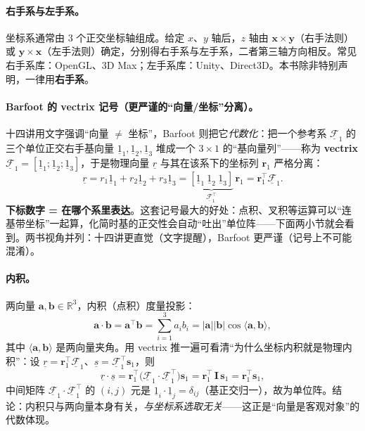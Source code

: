 \paragraph{右手系与左手系。}坐标系通常由 $3$ 个正交坐标轴组成。给定 $x$、$y$ 轴后，$z$ 轴由 $\mathbf{x}\times\mathbf{y}$（右手法则）或 $\mathbf{y}\times\mathbf{x}$（左手法则）确定，分别得右手系与左手系，二者第三轴方向相反。常见右手系库：OpenGL、3D Max；左手系库：Unity、Direct3D\cite{gaoxiang2019slam14}。本书除非特别声明，一律用\textbf{右手系}。

\paragraph{Barfoot 的 vectrix 记号（更严谨的“向量/坐标”分离）。}十四讲用文字强调“向量 $\neq$ 坐标”，Barfoot\cite{barfoot2024state} 则把它\emph{代数化}：把一个参考系 $\underline{\mathcal{F}}_1$ 的三个单位正交右手基向量 $\underline{1}_1,\underline{1}_2,\underline{1}_3$ 堆成一个 $3\times1$ 的“基向量列”——称为 \textbf{vectrix} $\underline{\mathcal{F}}_1=[\underline{1}_1;\underline{1}_2;\underline{1}_3]$，于是物理向量 $\underline{r}$ 与其在该系下的坐标列 $\mathbf{r}_1$ 严格分离：
\begin{equation}
  \underline{r}=r_1\underline{1}_1+r_2\underline{1}_2+r_3\underline{1}_3
  =\underbrace{[\underline{1}_1\ \underline{1}_2\ \underline{1}_3]}_{\underline{\mathcal{F}}_1^\top}\,\mathbf{r}_1
  =\mathbf{r}_1^\top\underline{\mathcal{F}}_1 .
\end{equation}
\textbf{下标数字 = 在哪个系里表达}。这套记号最大的好处：点积、叉积等运算可以“连基带坐标”一起算，化简时基的正交性会自动“吐出”单位阵——下面两小节就会看到。两书视角并列：十四讲更直觉（文字提醒），Barfoot 更严谨（记号上不可能混淆）。

\paragraph{内积。}两向量 $\mathbf{a},\mathbf{b}\in\mathbb{R}^3$，内积（点积）度量投影：
\begin{equation}
  \mathbf{a}\cdot\mathbf{b}=\mathbf{a}^\top\mathbf{b}=\sum_{i=1}^3 a_ib_i=|\mathbf{a}||\mathbf{b}|\cos\langle\mathbf{a},\mathbf{b}\rangle,
  \label{eq:rb-dot}
\end{equation}
其中 $\langle\mathbf{a},\mathbf{b}\rangle$ 是两向量夹角。用 vectrix 推一遍可看清“为什么坐标内积就是物理内积”：设 $\underline{r}=\mathbf{r}_1^\top\underline{\mathcal{F}}_1$、$\underline{s}=\underline{\mathcal{F}}_1^\top\mathbf{s}_1$，则
\begin{equation}
  \underline{r}\cdot\underline{s}
  =\mathbf{r}_1^\top\Big(\underline{\mathcal{F}}_1\cdot\underline{\mathcal{F}}_1^\top\Big)\mathbf{s}_1
  =\mathbf{r}_1^\top\,\mathbf{I}\,\mathbf{s}_1=\mathbf{r}_1^\top\mathbf{s}_1,
\end{equation}
中间矩阵 $\underline{\mathcal{F}}_1\cdot\underline{\mathcal{F}}_1^\top$ 的 $(i,j)$ 元是 $\underline{1}_i\cdot\underline{1}_j=\delta_{ij}$（基正交归一），故为单位阵。结论：内积只与两向量本身有关，\emph{与坐标系选取无关}——这正是“向量是客观对象”的代数体现。

